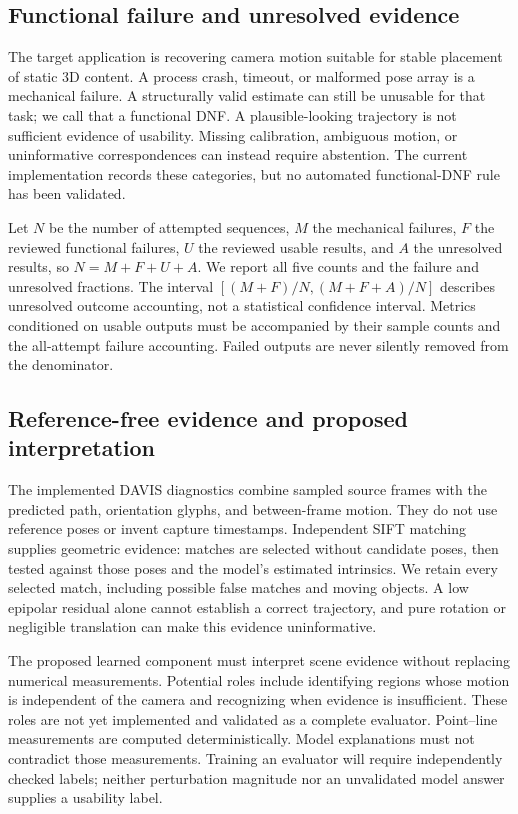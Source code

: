 \documentclass[10pt,twocolumn]{article}
\begin{document}
\subsection{Functional failure and unresolved evidence}
The target application is recovering camera motion suitable for stable placement of static 3D content. A process crash, timeout, or malformed pose array is a mechanical failure. A structurally valid estimate can still be unusable for that task; we call that a functional DNF. A plausible-looking trajectory is not sufficient evidence of usability. Missing calibration, ambiguous motion, or uninformative correspondences can instead require abstention. The current implementation records these categories, but no automated functional-DNF rule has been validated.

Let $N$ be the number of attempted sequences, $M$ the mechanical failures, $F$ the reviewed functional failures, $U$ the reviewed usable results, and $A$ the unresolved results, so $N=M+F+U+A$. We report all five counts and the failure and unresolved fractions. The interval $[(M+F)/N,(M+F+A)/N]$ describes unresolved outcome accounting, not a statistical confidence interval. Metrics conditioned on usable outputs must be accompanied by their sample counts and the all-attempt failure accounting. Failed outputs are never silently removed from the denominator.

\subsection{Reference-free evidence and proposed interpretation}
The implemented DAVIS diagnostics combine sampled source frames with the predicted path, orientation glyphs, and between-frame motion. They do not use reference poses or invent capture timestamps. Independent SIFT matching supplies geometric evidence: matches are selected without candidate poses, then tested against those poses and the model's estimated intrinsics. We retain every selected match, including possible false matches and moving objects. A low epipolar residual alone cannot establish a correct trajectory, and pure rotation or negligible translation can make this evidence uninformative.

The proposed learned component must interpret scene evidence without replacing numerical measurements. Potential roles include identifying regions whose motion is independent of the camera and recognizing when evidence is insufficient. These roles are not yet implemented and validated as a complete evaluator. Point--line measurements are computed deterministically. Model explanations must not contradict those measurements. Training an evaluator will require independently checked labels; neither perturbation magnitude nor an unvalidated model answer supplies a usability label.
\end{document}
